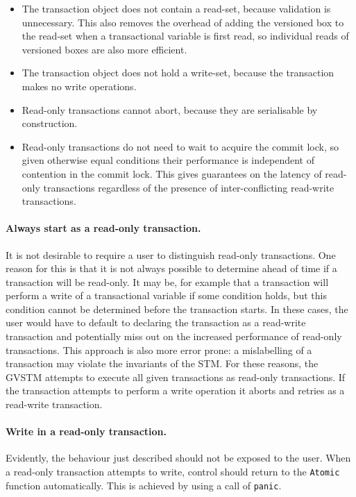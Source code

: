\documentclass[12pt,a4paper,oneside,openright]{report}
\newcommand{\goFunc}[1]{\texttt{#1}}
\begin{document}
\begin{itemize}
\item The transaction object does not contain a read-set, because
  validation is unnecessary. This also removes the overhead of adding
  the versioned box to the read-set when a transactional variable is
  first read, so individual reads of versioned boxes are also more
  efficient.
\item The transaction object does not hold a write-set, because the
  transaction makes no write operations.
\item Read-only transactions cannot abort, because they are
  serialisable by construction.
\item Read-only transactions do not need to wait to acquire the commit
  lock, so given otherwise equal conditions their performance is
  independent of contention in the commit lock. This gives guarantees
  on the latency of read-only transactions regardless of the presence
  of inter-conflicting read-write transactions.
\end{itemize}

\paragraph{Always start as a read-only transaction.} It is not
desirable to require a user to distinguish read-only transactions. One
reason for this is that it is not always possible to determine ahead
of time if a transaction will be read-only. It may be, for example
that a transaction will perform a write of a transactional variable if
some condition holds, but this condition cannot be determined before
the transaction starts. In these cases, the user would have to default
to declaring the transaction as a read-write transaction and
potentially miss out on the increased performance of read-only
transactions. This approach is also more error prone: a mislabelling
of a transaction may violate the invariants of the STM. For these
reasons, the GVSTM attempts to execute all given transactions as
read-only transactions. If the transaction attempts to perform a write
operation it aborts and retries as a read-write transaction.

\paragraph{Write in a read-only transaction.} Evidently, the behaviour
just described should not be exposed to the user. When a read-only
transaction attempts to write, control should return to the
\goFunc{Atomic} function automatically. This is achieved by using a
call of \goFunc{panic}.
\end{document}
